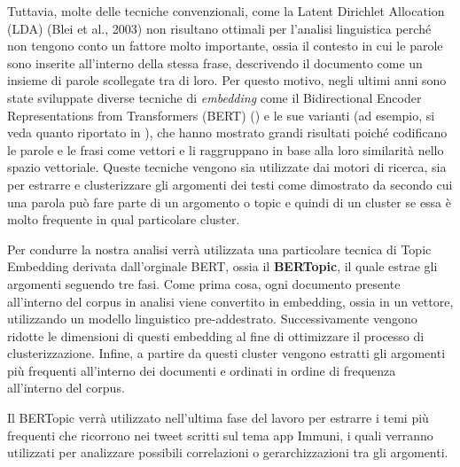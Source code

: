 Tuttavia, molte delle tecniche convenzionali, come la Latent Dirichlet Allocation (LDA) (Blei et al., 2003) non risultano ottimali per l'analisi linguistica perché non tengono conto un fattore molto importante, ossia il contesto in cui le parole sono inserite all'interno della stessa frase, descrivendo il documento come un insieme di parole scollegate tra di loro.
Per questo motivo, negli ultimi anni sono state sviluppate diverse tecniche di \textit{embedding} come il Bidirectional Encoder Representations from Transformers (BERT) (\cite{devlin-etal-2019-bert}) e le sue varianti (ad esempio, si veda quanto riportato in \cite{lee_bioinformatics_2019}), che hanno mostrato grandi risultati poiché codificano le parole e le frasi come vettori e li raggruppano in base alla loro similarità nello spazio vettoriale. Queste tecniche vengono sia utilizzate dai motori di ricerca, sia per estrarre e clusterizzare gli argomenti dei testi come dimostrato da \cite{sia-etal-2020-tired} secondo cui una parola può fare parte di un argomento o topic e quindi di un cluster se essa è molto frequente in qual particolare cluster.

Per condurre la nostra analisi verrà utilizzata una particolare tecnica di Topic Embedding derivata dall'orginale BERT, ossia il \textbf{BERTopic},  il quale estrae gli argomenti seguendo tre fasi.
Come prima cosa, ogni documento presente all'interno del corpus in analisi viene convertito in embedding, ossia in un vettore, utilizzando un modello linguistico pre-addestrato.
Successivamente vengono ridotte le dimensioni di questi embedding al fine di ottimizzare il processo di clusterizzazione. Infine, a partire da questi cluster vengono estratti gli argomenti più frequenti all'interno dei documenti e ordinati in ordine di frequenza all'interno del corpus.

Il BERTopic verrà utilizzato nell'ultima fase del lavoro per estrarre i temi più frequenti che ricorrono nei tweet scritti sul tema app Immuni, i quali verranno utilizzati per analizzare possibili correlazioni o gerarchizzazioni tra gli argomenti.


